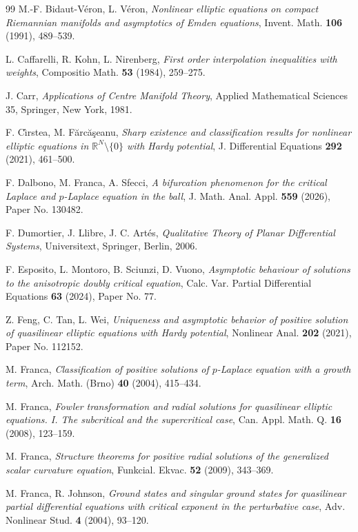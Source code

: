\documentclass[11pt,reqno]{amsart}
\numberwithin{equation}{section}
\theoremstyle{plain}
\theoremstyle{definition}
\newcommand{\R}{\mathbb{R}}
\begin{document}
\begin{thebibliography}{99}
M.-F. Bidaut-V\'eron, L. V\'eron,
\emph{Nonlinear elliptic equations on compact Riemannian manifolds and
asymptotics of Emden equations},
Invent. Math. \textbf{106} (1991), 489--539.

L. Caffarelli, R. Kohn, L. Nirenberg,
\emph{First order interpolation inequalities with weights},
Compositio Math. \textbf{53} (1984), 259--275.

J. Carr,
\emph{Applications of Centre Manifold Theory},
Applied Mathematical Sciences 35, Springer, New York, 1981.

F. C\^\i rstea, M. F\u{a}rc\u{a}\c seanu,
\emph{Sharp existence and classification results for nonlinear elliptic
equations in $\R^{N}\setminus\{0\}$ with Hardy potential},
J. Differential Equations \textbf{292} (2021), 461--500.

F. Dalbono, M. Franca, A. Sfecci,
\emph{A bifurcation phenomenon for the critical Laplace and $p$-Laplace
equation in the ball},
J. Math. Anal. Appl. \textbf{559} (2026), Paper No. 130482.

F. Dumortier, J. Llibre, J. C. Art\'es,
\emph{Qualitative Theory of Planar Differential Systems},
Universitext, Springer, Berlin, 2006.

F. Esposito, L. Montoro, B. Sciunzi, D. Vuono,
\emph{Asymptotic behaviour of solutions to the anisotropic doubly critical
equation},
Calc. Var. Partial Differential Equations \textbf{63} (2024), Paper No. 77.

Z. Feng, C. Tan, L. Wei,
\emph{Uniqueness and asymptotic behavior of positive solution of quasilinear
elliptic equations with Hardy potential},
Nonlinear Anal. \textbf{202} (2021), Paper No. 112152.

M. Franca,
\emph{Classification of positive solutions of $p$-Laplace equation with a growth
term},
Arch. Math. (Brno) \textbf{40} (2004), 415--434.

M. Franca,
\emph{Fowler transformation and radial solutions for quasilinear elliptic
equations. I. The subcritical and the supercritical case},
Can. Appl. Math. Q. \textbf{16} (2008), 123--159.

M. Franca,
\emph{Structure theorems for positive radial solutions of the generalized scalar
curvature equation},
Funkcial. Ekvac. \textbf{52} (2009), 343--369.

M. Franca, R. Johnson,
\emph{Ground states and singular ground states for quasilinear partial
differential equations with critical exponent in the perturbative case},
Adv. Nonlinear Stud. \textbf{4} (2004), 93--120.


\end{thebibliography}
\end{document}
